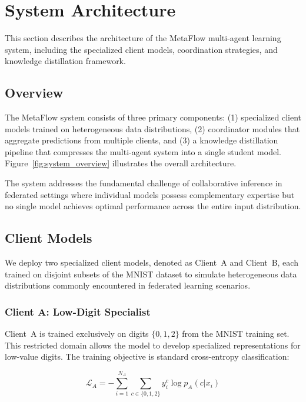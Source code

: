 \section{System Architecture}
\label{sec:architecture}

This section describes the architecture of the MetaFlow multi-agent learning system, including the specialized client models, coordination strategies, and knowledge distillation framework.

\subsection{Overview}
\label{subsec:overview}

The MetaFlow system consists of three primary components: (1) specialized client models trained on heterogeneous data distributions, (2) coordinator modules that aggregate predictions from multiple clients, and (3) a knowledge distillation pipeline that compresses the multi-agent system into a single student model. Figure~\ref{fig:system_overview} illustrates the overall architecture.

The system addresses the fundamental challenge of collaborative inference in federated settings where individual models possess complementary expertise but no single model achieves optimal performance across the entire input distribution.

\subsection{Client Models}
\label{subsec:client_models}

We deploy two specialized client models, denoted as Client~A and Client~B, each trained on disjoint subsets of the MNIST dataset to simulate heterogeneous data distributions commonly encountered in federated learning scenarios.

\subsubsection{Client A: Low-Digit Specialist}

Client~A is trained exclusively on digits $\{0, 1, 2\}$ from the MNIST training set. This restricted domain allows the model to develop specialized representations for low-value digits. The training objective is standard cross-entropy classification:

\begin{equation}
\mathcal{L}_A = -\sum_{i=1}^{N_A} \sum_{c \in \{0,1,2\}} y_i^c \log p_A(c | x_i)
\end{equation}

